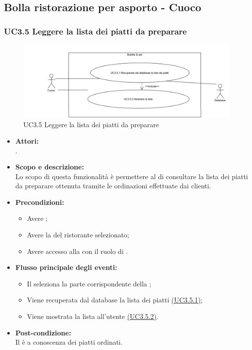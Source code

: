 \subsection{Bolla ristorazione per asporto - Cuoco}

\subsubsection{UC3.5 Leggere la lista dei piatti da preparare} \label{UC3.5}

\begin{figure}[H]
	\centering
	\includegraphics[width=15cm]{../../documenti/AnalisiDeiRequisiti/Diagrammi_img/uc3_5.png}
	\caption{UC3.5 Leggere la lista dei piatti da preparare}
\end{figure}

\begin{itemize}
	\item \textbf{Attori:}
	\\.
	\item \textbf{Scopo e descrizione:} 
	\\Lo scopo di questa funzionalità è permettere al  di consultare la lista dei piatti da preparare ottenuta tramite le ordinazioni effettuate dai clienti.
	\item \textbf{Precondizioni:}
	\begin{itemize}
		\item Avere ;
		\item Avere la  del ristorante selezionato;
		\item Avere accesso alla  con il ruolo di .
	\end{itemize}
	\item \textbf{Flusso principale degli eventi:}
	\begin{itemize}
		\item Il  seleziona la parte corrispondente della ;
		\item Viene recuperata dal database la lista dei piatti \hyperref[UC3.5.1]{(UC3.5.1)};
		\item Viene mostrata la lista all'utente \hyperref[UC3.5.2]{(UC3.5.2)}.
	\end{itemize}
	\item \textbf{Post-condizione:}
	\\Il {} è a conoscenza dei piatti ordinati.
\end{itemize}

